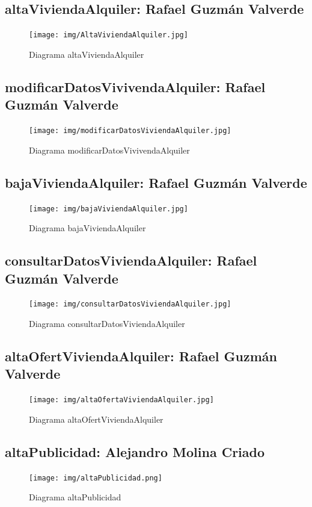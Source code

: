 \subsection{altaViviendaAlquiler: Rafael Guzmán Valverde}
\begin{figure}[!h]
  \centering
    \texttt{[image: img/AltaViviendaAlquiler.jpg]}
    \caption{Diagrama altaViviendaAlquiler}
\end{figure}

\pagebreak
\subsection{modificarDatosVivivendaAlquiler: Rafael Guzmán Valverde}
\begin{figure}[!h]
  \centering
    \texttt{[image: img/modificarDatosViviendaAlquiler.jpg]}
    \caption{Diagrama modificarDatosVivivendaAlquiler}
\end{figure}

\subsection{bajaViviendaAlquiler: Rafael Guzmán Valverde}
\begin{figure}[!h]
  \centering
    \texttt{[image: img/bajaViviendaAlquiler.jpg]}
    \caption{Diagrama bajaViviendaAlquiler}
\end{figure}

\pagebreak
\subsection{consultarDatosViviendaAlquiler: Rafael Guzmán Valverde}
\begin{figure}[!h]
  \centering
    \texttt{[image: img/consultarDatosViviendaAlquiler.jpg]}
    \caption{Diagrama consultarDatosViviendaAlquiler}
\end{figure}

\subsection{altaOfertViviendaAlquiler: Rafael Guzmán Valverde}
\begin{figure}[!h]
  \centering
    \texttt{[image: img/altaOfertaViviendaAlquiler.jpg]}
    \caption{Diagrama altaOfertViviendaAlquiler}
\end{figure}

\pagebreak
\subsection{altaPublicidad: Alejandro Molina Criado}
\begin{figure}[!h]
  \centering
    \texttt{[image: img/altaPublicidad.png]}
    \caption{Diagrama altaPublicidad}
\end{figure}